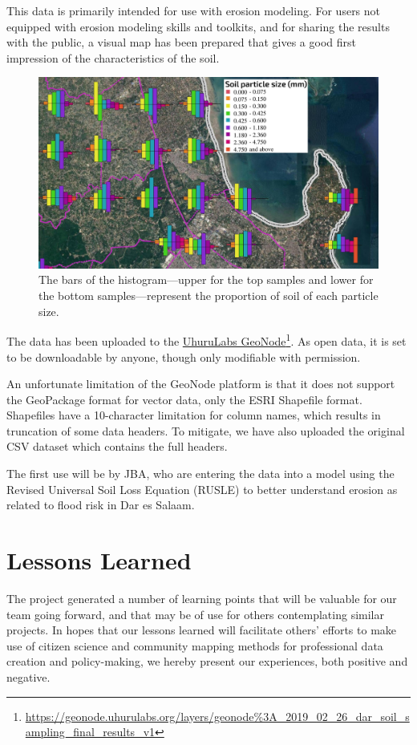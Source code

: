 \documentclass[a4paper,12pt]{article}
\begin{document}
This data is primarily intended for use with erosion modeling. For users not equipped with erosion modeling skills and toolkits, and for sharing the results with the public, a visual map has been prepared that gives a good first impression of the characteristics of the soil.

\begin{figure}[h]
  \caption{The bars of the histogram---upper for the top samples and lower for the bottom samples---represent the proportion of soil of each particle size.}
  \centering
  \includegraphics[width=1.1\textwidth]{soil_map_detail_peninsula_with_legend}
\end{figure}

The data has been uploaded to the \href{https://geonode.uhurulabs.org/layers/geonode\%3A_2019_02_26_dar_soil_sampling_final_results_v1}{UhuruLabs GeoNode}\footnote{\url {https://geonode.uhurulabs.org/layers/geonode\%3A_2019_02_26_dar_soil_sampling_final_results_v1}}. As open data, it is set to be downloadable by anyone, though only modifiable with permission.

An unfortunate limitation of the GeoNode platform is that it does not support the GeoPackage format for vector data, only the ESRI Shapefile format. Shapefiles have a 10-character limitation for column names, which results in truncation of some data headers. To mitigate, we have also uploaded the original CSV dataset which contains the full headers. 

The first use will be by JBA, who are entering the data into a model using the Revised Universal Soil Loss Equation (RUSLE) to better understand erosion as related to flood risk in Dar es Salaam.

\hypertarget{lessonslearned}{}
\section{Lessons Learned}
\label{lessonslearned}
The project generated a number of learning points that will be valuable for our team going forward, and that may be of use for others contemplating similar projects. In hopes that our lessons learned will facilitate others' efforts to make use of citizen science and community mapping methods for professional data creation and policy-making, we hereby present our experiences, both positive and negative.
\end{document}
